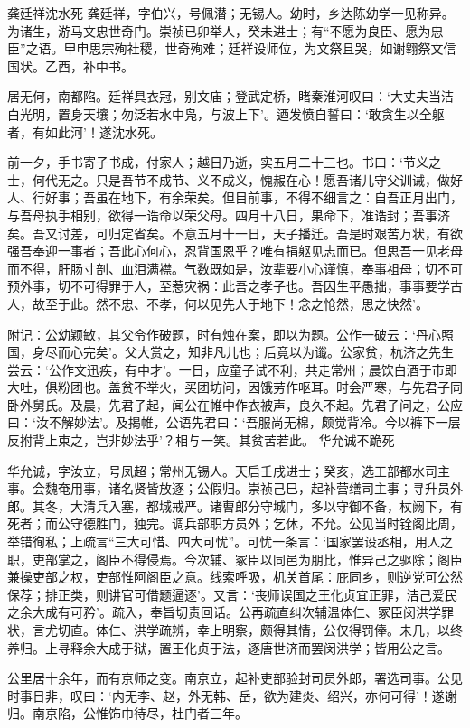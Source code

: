 \documentclass[]{article}
\begin{document}
龚廷祥沈水死
龚廷祥，字伯兴，号佩潜；无锡人。幼时，乡达陈幼学一见称异。为诸生，游马文忠世奇门。崇祯已卯举人，癸未进士；有``不愿为良臣、愿为忠臣''之语。甲申思宗殉社稷，世奇殉难；廷祥设师位，为文祭且哭，如谢翱祭文信国状。乙酉，补中书。

居无何，南都陷。廷祥具衣冠，别文庙；登武定桥，睹秦淮河叹曰：`大丈夫当洁白光明，置身天壤；勿泛若水中凫，与波上下'。迺发愤自誓曰：`敢贪生以全躯者，有如此河'！遂沈水死。

前一夕，手书寄子书成，付家人；越日乃逝，实五月二十三也。书曰：`节义之士，何代无之。只是吾节不成节、义不成义，愧赧在心！愿吾诸儿守父训诫，做好人、行好事；吾虽在地下，有余荣矣。但目前事，不得不细言之：自吾正月出门，与吾母执手相别，欲得一诰命以荣父母。四月十八日，果命下，准诰封；吾事济矣。吾又讨差，可归定省矣。不意五月十一日，天子播迁。吾是时艰苦万状，有欲强吾奉迎一事者；吾此心何心，忍背国恩乎？唯有捐躯见志而已。但思吾一见老母而不得，肝肠寸剖、血泪满襟。气数既如是，汝辈要小心谨慎，奉事祖母；切不可预外事，切不可得罪于人，至惹灾祸：此吾之孝子也。吾因生平愚拙，事事要学古人，故至于此。然不忠、不孝，何以见先人于地下！念之怆然，思之快然'。

附记：公幼颖敏，其父令作破题，时有烛在案，即以为题。公作一破云：`丹心照国，身尽而心完矣'。父大赏之，知非凡儿也；后竟以为谶。公家贫，杭济之先生尝云：`公作文迅疾，有中才'。一日，应童子试不利，共走常州；晨饮白酒于市即大吐，俱粉团也。盖贫不举火，买团坊问，因饿劳作呕耳。时会严寒，与先君子同卧外舅氏。及晨，先君子起，闻公在帷中作衣被声，良久不起。先君子问之，公应曰：`汝不解妙法'。及揭帷，公语先君曰：`吾服尚无棉，颇觉背冷。今以裤下一层反拊背上束之，岂非妙法乎'？相与一笑。其贫苦若此。
华允诚不跪死

华允诚，字汝立，号凤超；常州无锡人。天启壬戌进士；癸亥，选工部都水司主事。会魏奄用事，诸名贤皆放逐；公假归。崇祯己巳，起补营缮司主事；寻升员外郎。其冬，大清兵入塞，都城戒严。诸曹郎分守城门，多以守御不备，杖阙下，有死者；而公守德胜门，独完。调兵部职方员外；乞休，不允。公见当时铨阁比周，举错徇私；上疏言``三大可惜、四大可忧''。可忧一条言：`国家罢设丞相，用人之职，吏部掌之，阁臣不得侵焉。今次辅、冢臣以同邑为朋比，惟异己之驱除；阁臣兼操吏部之权，吏部惟阿阁臣之意。线索呼吸，机关首尾：庇同乡，则逆党可公然保荐；排正类，则讲官可借题逼逐'。又言：`丧师误国之王化贞宜正罪，洁己爱民之余大成有可矜'。疏入，奉旨切责回话。公再疏直纠次辅温体仁、冢臣闵洪学罪状，言尤切直。体仁、洪学疏辨，幸上明察，颇得其情，公仅得罚俸。未几，以终养归。上寻释余大成于狱，置王化贞于法，逐唐世济而罢闵洪学；皆用公之言。

公里居十余年，而有京师之变。南京立，起补吏部验封司员外郎，署选司事。公见时事日非，叹曰：`内无李、赵，外无韩、岳，欲为建炎、绍兴，亦何可得'！遂谢归。南京陷，公惟饰巾待尽，杜门者三年。
\end{document}
